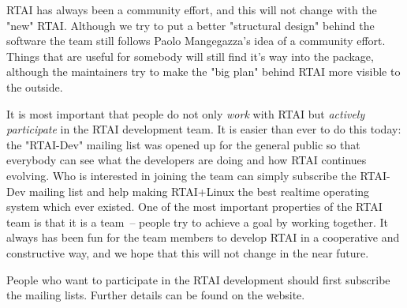 RTAI has always been a community effort, and this will not change with
the "new" RTAI. Although we try to put a better "structural design"
behind the software the team still follows Paolo Mangegazza's idea of
a community effort. Things that are useful for somebody will still
find it's way into the package, although the maintainers try to make
the "big plan" behind RTAI more visible to the outside.

It is most important that people do not only \emph{work} with RTAI but
\emph{actively participate} in the RTAI development team. It is easier
than ever to do this today: the "RTAI-Dev" mailing list was opened up
for the general public so that everybody can see what the developers are
doing and how RTAI continues evolving. Who is interested in joining the
team can simply subscribe the RTAI-Dev mailing list and help making
RTAI+Linux the best realtime operating system which ever existed. One of
the most important properties of the RTAI team is that it is a team~--
people try to achieve a goal by working together. It always has been fun
for the team members to develop RTAI in a cooperative and constructive
way, and we hope that this will not change in the near future.

People who want to participate in the RTAI development should first
subscribe the mailing lists. Further details can be found on the
website. 




